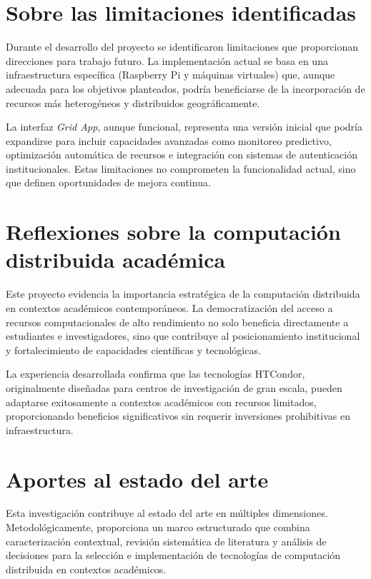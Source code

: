 \section{Sobre las limitaciones identificadas}
\noindent

Durante el desarrollo del proyecto se identificaron limitaciones que proporcionan direcciones para trabajo futuro. La implementación actual se basa en una infraestructura específica (Raspberry Pi y máquinas virtuales) que, aunque adecuada para los objetivos planteados, podría beneficiarse de la incorporación de recursos más heterogéneos y distribuidos geográficamente.

La interfaz \textit{Grid App}, aunque funcional, representa una versión inicial que podría expandirse para incluir capacidades avanzadas como monitoreo predictivo, optimización automática de recursos e integración con sistemas de autenticación institucionales. Estas limitaciones no comprometen la funcionalidad actual, sino que definen oportunidades de mejora continua.

\section{Reflexiones sobre la computación distribuida académica}
\noindent

Este proyecto evidencia la importancia estratégica de la computación distribuida en contextos académicos contemporáneos. La democratización del acceso a recursos computacionales de alto rendimiento no solo beneficia directamente a estudiantes e investigadores, sino que contribuye al posicionamiento institucional y fortalecimiento de capacidades científicas y tecnológicas.

La experiencia desarrollada confirma que las tecnologías HTCondor, originalmente diseñadas para centros de investigación de gran escala, pueden adaptarse exitosamente a contextos académicos con recursos limitados, proporcionando beneficios significativos sin requerir inversiones prohibitivas en infraestructura.

\section{Aportes al estado del arte}
\noindent

Esta investigación contribuye al estado del arte en múltiples dimensiones. Metodológicamente, proporciona un marco estructurado que combina caracterización contextual, revisión sistemática de literatura y análisis de decisiones para la selección e implementación de tecnologías de computación distribuida en contextos académicos.

